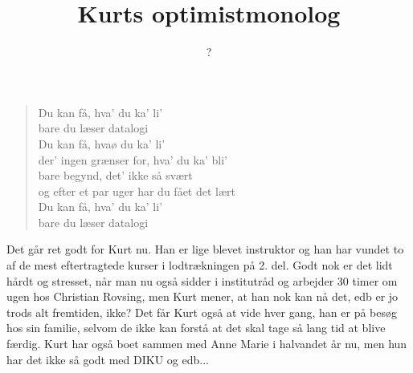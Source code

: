 \documentclass[a4paper,11pt]{article}
\title{Kurts optimistmonolog}
\author{?}
\begin{document}
\maketitle

\begin{sketch}
\begin{quote}
    Du kan få, hva' du ka' li' \\
    bare du læser datalogi \\
    Du kan få, hvaø du ka' li' \\
    der' ingen grænser for, hva' du ka' bli' \\
    bare begynd, det' ikke så svært \\
    og efter et par uger har du fået det lært \\
    Du kan få, hva' du ka' li' \\
    bare du læser datalogi 
\end{quote}

Det går ret godt for Kurt nu. Han er lige blevet instruktor og han har vundet to af de mest eftertragtede kurser i lodtrækningen på 2. del. Godt nok er det lidt hårdt og stresset, når man nu også sidder i institutråd og arbejder 30 timer om ugen hos Christian Rovsing, men Kurt mener, at han nok kan nå det, edb er jo trods alt fremtiden, ikke? Det får Kurt også at vide hver gang, han er på besøg hos sin familie, selvom de ikke kan forstå at det skal tage så lang tid at blive færdig. Kurt har også boet sammen med Anne Marie i halvandet år nu, men hun har det ikke så godt med DIKU og edb...

\end{sketch}
\end{document}
